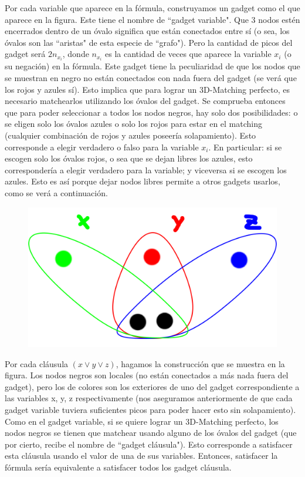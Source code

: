 \documentclass{article}
\begin{document}
Por cada variable que aparece en la fórmula, construyamos un gadget como el que aparece en la figura. Este tiene el nombre de ``gadget variable". Que 3 nodos estén encerrados dentro de un óvalo significa que están conectados entre sí (o sea, los óvalos son las ``aristas" de esta especie de ``grafo"). Pero la cantidad de picos del gadget será $2n_{x_i}$, donde $n_{x_i}$ es la cantidad de veces que aparece la variable $x_i$ (o su negación) en la fórmula. Este gadget tiene la peculiaridad de que los nodos que se muestran en negro no están conectados con nada fuera del gadget (se verá que los rojos y azules sí). Esto implica que para lograr un 3D-Matching perfecto, es necesario matchearlos utilizando los óvalos del gadget. Se comprueba entonces que para poder seleccionar a todos los nodos negros, hay solo dos posibilidades: o se eligen solo los óvalos azules o solo los rojos para estar en el matching (cualquier combinación de rojos y azules poseería solapamiento). Esto corresponde a elegir verdadero o falso para la variable $x_i$. En particular: si se escogen solo los óvalos rojos, o sea que se dejan libres los azules, esto correspondería a elegir verdadero para la variable; y viceversa si se escogen los azules. Esto es así porque dejar nodos libres permite a otros gadgets usarlos, como se verá a continuación.

\pagebreak

\begin{figure}[hp]
	\begin{center}
		\includegraphics[scale=0.1]{IMGs/3DM 2.png}	
	\end{center}
\end{figure}

Por cada cláusula $(x \vee y \vee z)$, hagamos la construcción que se muestra en la figura. Los nodos negros son locales (no están conectados a más nada fuera del gadget), pero los de colores son los exteriores de uno del gadget correspondiente a las variables x, y, z respectivamente (nos aseguramos anteriormente de que cada gadget variable tuviera suficientes picos para poder hacer esto sin solapamiento). Como en el gadget variable, si se quiere lograr un 3D-Matching perfecto, los nodos negros se tienen que matchear usando alguno de los óvalos del gadget (que por cierto, recibe el nombre de ``gadget cláusula"). Esto corresponde a satisfacer esta cláusula usando el valor de una de sus variables. Entonces, satisfacer la fórmula sería equivalente a satisfacer todos los gadget cláusula. 
\end{document}
